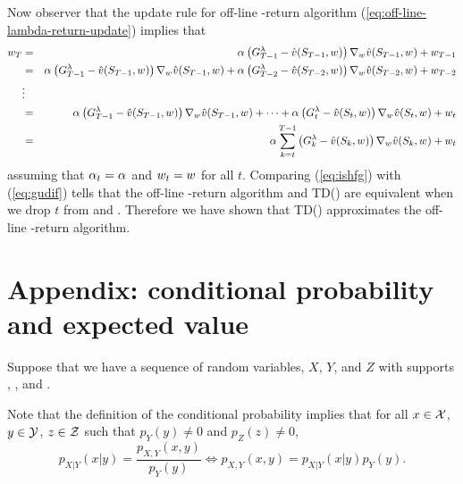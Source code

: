 Now observer that the update rule for off-line \tdparam-return algorithm
(\ref{eq:off-line-lambda-return-update}) implies that
\begin{eqnarray}
\nonumber
w_{T}
&=& \alpha_{} \left( G^{\lambda}_{T-1} - \hat{v}(S_{T-1}, w_{}) \right) \nabla_{w_{}} \hat{v}(S_{T-1}, w_{})
+ w_{T-1}
\\
\nonumber
&=&
\alpha_{} \left( G^{\lambda}_{T-1} - \hat{v}(S_{T-1}, w_{}) \right) \nabla_{w_{}} \hat{v}(S_{T-1}, w_{})
+ \alpha_{} \left( G^{\lambda}_{T-2} - \hat{v}(S_{T-2}, w_{}) \right) \nabla_{w_{}} \hat{v}(S_{T-2}, w_{})
+ w_{T-2}
\\
\nonumber
&\vdots&
\\
\nonumber
&=&
\alpha_{} \left( G^{\lambda}_{T-1} - \hat{v}(S_{T-1}, w_{}) \right) \nabla_{w_{}} \hat{v}(S_{T-1}, w_{})
+ \cdots
+ \alpha_{} \left( G^{\lambda}_{t} - \hat{v}(S_{t}, w_{}) \right) \nabla_{w_{}} \hat{v}(S_{t}, w_{})
+ w_{t}
\\
&=& \alpha_{} \sum_{k=t}^{T-1}
\left( G^{\lambda}_{k} - \hat{v}(S_{k}, w_{}) \right)
\nabla_{w_{}} \hat{v}(S_{k},w_{})
+ w_{t}
\label{eq:gudif}
\end{eqnarray}
assuming that $\alpha_{t} = \alpha_{}$ and $w_{t}=w_{}$ for all $t$.
Comparing (\ref{eq:ishfg}) with (\ref{eq:gudif}) tells that
the off-line \tdparam-return algorithm and TD(\tdparam) are equivalent
when we drop $t$ from  and .
Therefore we have shown that TD(\tdparam) approximates the off-line \tdparam-return algorithm.



\newpage
\section{Appendix: conditional probability and expected value}
\label{sec:rl-app}


Suppose that we have a sequence of random variables, $X$, $Y$, and $Z$
with supports \suppx, \suppy, and \suppz.

Note that the definition of the conditional probability implies that
for all $x\in\mathcal{X}$, $y\in\mathcal{Y}$, $z\in\mathcal{Z}$ such that $p_Y(y)\neq0$ and $p_Z(z)\neq 0$,
\begin{equation}
\label{eq:vusg-1}
p_{X|Y}(x|y)
= \frac{p_{X,Y}(x,y)}{p_Y(y)}
\Leftrightarrow
p_{X,Y}(x,y) = p_{X|Y}(x|y) p_Y(y).
\end{equation}


